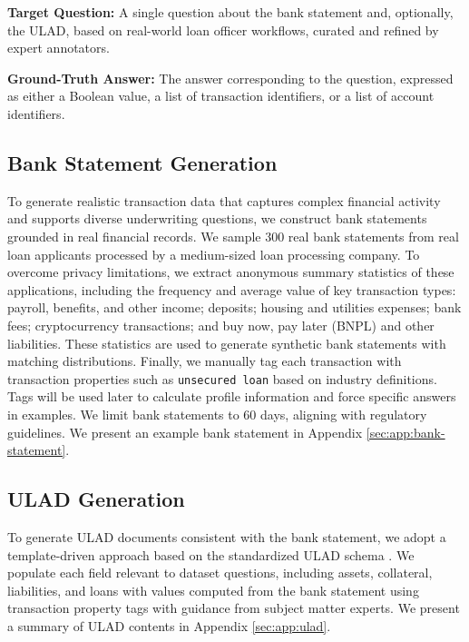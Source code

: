 \documentclass[11pt]{article}
\begin{document}
\noindent \textbf{Target Question:} A single question about the bank statement and, optionally, the ULAD, based on real-world loan officer workflows, curated and refined by expert annotators.

\noindent \textbf{Ground-Truth Answer:} The answer corresponding to the question, expressed as either a Boolean value, a list of transaction identifiers, or a list of account identifiers.




\subsection{Bank Statement Generation}
\label{sec:bank-statement}

To generate realistic transaction data that captures complex financial activity and supports diverse underwriting questions, we construct bank statements grounded in real financial records.
We sample 300 real bank statements from real loan applicants processed by a medium-sized loan processing company.
To overcome privacy limitations, we extract anonymous summary statistics of these applications, including the frequency and average value of key transaction types: payroll, benefits, and other income; deposits; housing and utilities expenses; bank fees; cryptocurrency transactions; and buy now, pay later (BNPL) and other liabilities.
These statistics are used to generate synthetic bank statements with matching distributions.
Finally, we manually tag each transaction with transaction properties such as \texttt{unsecured loan} based on industry definitions.
Tags will be used later to calculate profile information and force specific answers in examples.
We limit bank statements to 60 days, aligning with regulatory guidelines.
We present an example bank statement in Appendix \ref{sec:app:bank-statement}.

\subsection{ULAD Generation}
\label{sec:ULAD-gen}

To generate ULAD documents consistent with the bank statement, we adopt a template-driven approach based on the standardized ULAD schema \citep{freddiemac_ulad}.
We populate each field relevant to dataset questions, including assets, collateral, liabilities, and loans with values computed from the bank statement using transaction property tags with guidance from subject matter experts.
We present a summary of ULAD contents in Appendix \ref{sec:app:ulad}.
\end{document}
